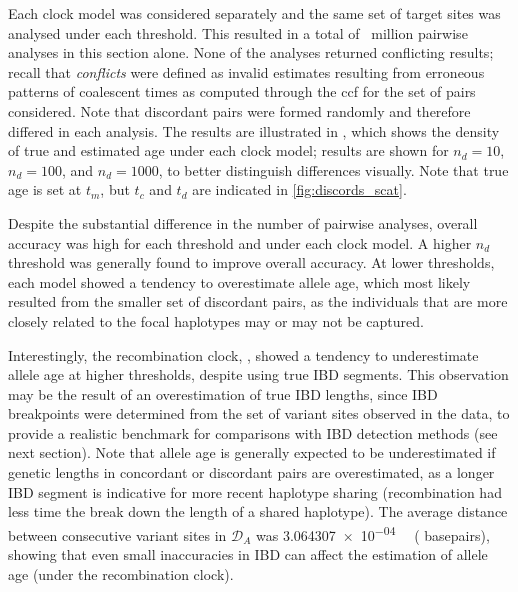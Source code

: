 Each clock model was considered separately and the same set of  target sites was analysed under each threshold.
This resulted in a total of ~million pairwise analyses in this section alone.
None of the analyses returned conflicting results; recall that \emph{conflicts} were defined as invalid estimates resulting from erroneous patterns of coalescent times as computed through the \gls{ccf} for the set of pairs considered.
Note that discordant pairs were formed randomly and therefore differed in each analysis.
The results are illustrated in , which shows the density of true and estimated age under each clock model; results are shown for ${n_d = \num{10}}$, ${n_d = \num{100}}$, and ${n_d = \num{1000}}$, to better distinguish differences visually.
Note that true age is set at $t_m$, but $t_c$ and $t_d$ are indicated in \cref{fig:discords_scat}.

%

%

Despite the substantial difference in the number of pairwise analyses, overall accuracy was high for each threshold and under each clock model.
A higher $n_d$ threshold was generally found to improve overall accuracy.
At lower thresholds, each model showed a tendency to overestimate allele age, which most likely resulted from the smaller set of discordant pairs, as the individuals that are more closely related to the focal haplotypes may or may not be captured.

Interestingly, the recombination clock, \ClockR, showed a tendency to underestimate allele age at higher thresholds, despite using true IBD segments.
This observation may be the result of an overestimation of true IBD lengths, since IBD breakpoints were determined from the set of variant sites observed in the data, to provide a realistic benchmark for comparisons with IBD detection methods (see next section).
Note that allele age is generally expected to be underestimated if genetic lengths in concordant or discordant pairs are overestimated, as a longer IBD segment is indicative for more recent haplotype sharing (\ie recombination had less time the break down the length of a shared haplotype).
The average distance between consecutive variant sites in ${\mathcal{D}_A}$ was \SI{3.064307e-04}{\centi\morgan} ( basepairs), showing that even small inaccuracies in IBD can affect the estimation of allele age (under the recombination clock).

